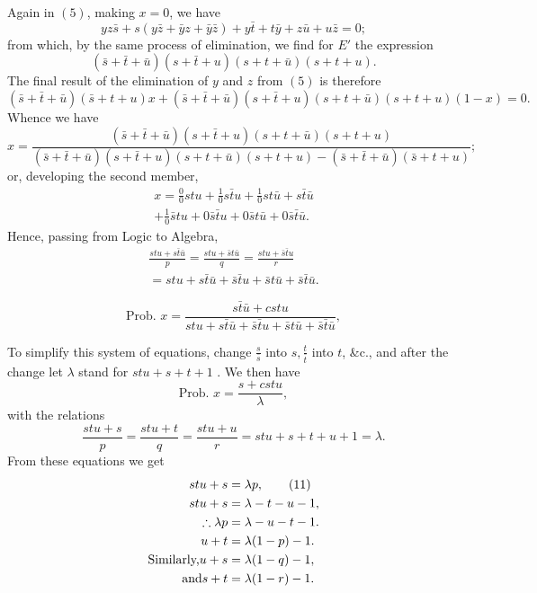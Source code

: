 \documentclass[oneside]{book}
\begin{document}
Again in $(5)$, making $x = 0$, we have
\[
yz\bar{s} + s(y\bar{z} + \bar{y}z + \bar{y}\bar{z}) + y\bar{t} + t\bar{y} + z\bar{u} + u\bar{z} = 0;
\]
from which, by the same process of elimination, we find for $E'$ the
expression
\[
(\bar{s} + \bar{t} + \bar{u})(s + \bar{t} + u)(s + t + \bar{u})(s + t + u).
\]
The final result of the elimination of $y$ and $z$ from $(5)$ is therefore
\[
(\bar{s} + \bar{t} + \bar{u})(\bar{s} + t + u)x + (\bar{s} + \bar{t} + \bar{u})(s + \bar{t} + u)(s + t + \bar{u})(s + t + u)(1 - x) = 0.
\]
Whence we have
\[
x = \frac{(\bar{s} + \bar{t} + \bar{u})(s + \bar{t} + u)(s + t + \bar{u})(s + t + u)}
         {(\bar{s} + \bar{t} + \bar{u})(s + \bar{t} + u)(s + t + \bar{u})(s + t + u) - (\bar{s} + \bar{t} + \bar{u})(\bar{s} + t + u)};
\]
or, developing the second member,
\begin{equation}
\begin{split}
x = \frac{0}{0}stu + \frac{1}{0}s\bar{t}u + \frac{1}{0}st\bar{u}
+ s\bar{t}\bar{u}
\\
+ \frac{1}{0}\bar{s}tu + 0\bar{s}\bar{t}u + 0\bar{s}t\bar{u}
+ 0\bar{s}\bar{t}\bar{u}. %
\end{split}
\end{equation}
Hence, passing from Logic to Algebra,
\begin{equation}
\begin{split}
  \frac{stu + s\bar{t}\bar{u}}{p}
= \frac{stu + \bar{s}t\bar{u}}{q}
= \frac{stu + \bar{s}\bar{t}u}{r}
\\
= stu + s\bar{t}\bar{u} + \bar{s}\bar{t}u + \bar{s}t\bar{u}
+ \bar{s}\bar{t}\bar{u}. %
\end{split}
\end{equation}

\[
  \text{Prob. }x = \frac{s\bar{t}\bar{u} + cstu}{stu + s\bar{t}\bar{u} + \bar{s}\bar{t}u + \bar{s}t\bar{u} + \bar{s}\bar{t}\bar{u}}, \tag{8}
\]

To simplify this system of equations, change ${\displaystyle \frac{s}{\bar{s}}}$ into ${\displaystyle s, \frac{t}{\bar{t}}}$ into $t$, \&c., and after the change let $\lambda$ stand for $stu + s + t + 1$ . We then have
\[
  \text{Prob. }x = \frac{s + cstu}{\lambda}, \tag{9}
\]
with the relations
\[
  \frac{stu + s}{p} = \frac{stu + t}{q} = \frac{stu + u}{r} = stu + s + t + u + 1 = \lambda. \tag{10}
\]
From these equations we get
\begin{align*}
                      stu + s &= \lambda p,           \tag{11} \\
                      stu + s &= \lambda - t - u - 1, \\
         \therefore \lambda p &= \lambda - u - t - 1. \\
                        u + t &= \lambda(1 - p) - 1.  \\
\text{Similarly,}\hfill u + s &= \lambda(1 - q) - 1,  \hfill \\
\text{and}\hfill        s + t &= \lambda(1 - r) - 1.  \hfill
\end{align*}
\end{document}
